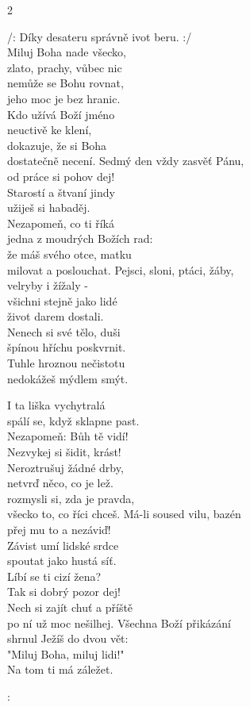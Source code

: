 \newpage
{}
\begin{multicols}{2}

\cho{}
/: Díky desateru správně ivot beru. :/\\

\ve{}
Miluj Boha nade všecko,\\
zlato, prachy, vůbec nic\\
nemůže se Bohu rovnat,\\
jeho moc je bez hranic.\\
Kdo užívá Boží jméno\\
neuctivě ke klení,\\
dokazuje, že si Boha\\
dostatečně necení.
\cho{}
\ve{}
Sedmý den vždy zasvěť Pánu,\\
od práce si pohov dej!\\
Starostí a štvaní jindy\\
užiješ si habaděj.\\
Nezapomeň, co ti říká\\
jedna z moudrých Božích rad:\\
že máš svého otce, matku\\
milovat a poslouchat.
\cho{}
\ve{}
Pejsci, sloni, ptáci, žáby,\\
velryby i žížaly -\\
všichni stejně jako lidé\\
život darem dostali.\\
Nenech si své tělo, duši\\
špínou hříchu poskvrnit.\\
Tuhle hroznou nečistotu\\
nedokážeš mýdlem smýt.
\cho{}

\vfill\columnbreak\vspace*{\fill}

\ve{}
I ta liška vychytralá\\
spálí se, když sklapne past.\\
Nezapomeň: Bůh tě vidí!\\
Nezvykej si šidit, krást!\\
Neroztrušuj žádné drby,\\
netvrď něco, co je lež.\\
rozmysli si, zda je pravda,\\
všecko to, co říci chceš.
\cho{}
\ve{}
Má-li soused vilu, bazén\\
přej mu to a nezáviď!\\
Závist umí lidské srdce\\
spoutat jako hustá síť.\\
Líbí se ti cizí žena?\\
Tak si dobrý pozor dej!\\
Nech si zajít chuť a příště\\
po ní už moc nešilhej.
\cho{}
\re{*}
Všechna Boží přikázání\\
shrnul Ježíš do dvou vět:\\
"Miluj Boha, miluj lidi!"\\
Na tom ti má záležet.

: 

\end{multicols}
\esong{}